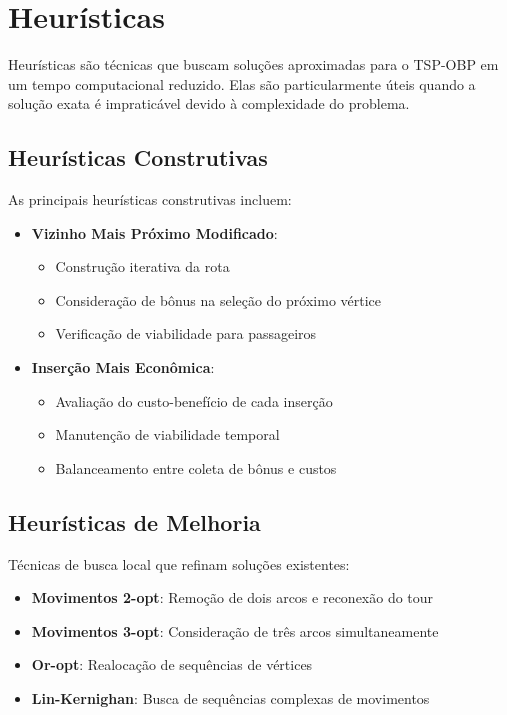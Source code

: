 \documentclass[12pt, a4paper]{report}
\begin{document}
\section{Heurísticas}
Heurísticas são técnicas que buscam soluções aproximadas para o TSP-OBP em um tempo computacional reduzido. Elas são particularmente úteis quando a solução exata é impraticável devido à complexidade do problema.

\subsection{Heurísticas Construtivas}
As principais heurísticas construtivas incluem:

\begin{itemize}
    \item \textbf{Vizinho Mais Próximo Modificado}: 
    \begin{itemize}
        \item Construção iterativa da rota
        \item Consideração de bônus na seleção do próximo vértice
        \item Verificação de viabilidade para passageiros
    \end{itemize}
    
    \item \textbf{Inserção Mais Econômica}:
    \begin{itemize}
        \item Avaliação do custo-benefício de cada inserção
        \item Manutenção de viabilidade temporal
        \item Balanceamento entre coleta de bônus e custos
    \end{itemize}
\end{itemize}

\subsection{Heurísticas de Melhoria}
Técnicas de busca local que refinam soluções existentes:

\begin{itemize}
    \item \textbf{Movimentos 2-opt}: Remoção de dois arcos e reconexão do tour
    \item \textbf{Movimentos 3-opt}: Consideração de três arcos simultaneamente
    \item \textbf{Or-opt}: Realocação de sequências de vértices
    \item \textbf{Lin-Kernighan}: Busca de sequências complexas de movimentos
\end{itemize}
\end{document}
